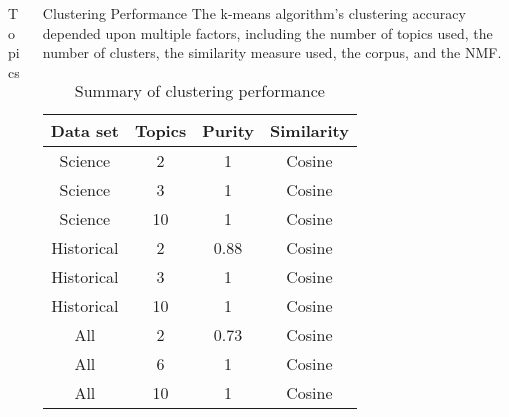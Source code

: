 \documentclass[final]{beamer}
\newlength{\onecolwid}
\newlength{\twocolwid}
\begin{document}
\begin{frame}[t]
\begin{columns}[t]
\begin{column}{\twocolwid}
\begin{columns}[t,totalwidth=\twocolwid]
\begin{column}{\onecolwid}
\begin{block}{Topics}
\end{block}


\end{column} %

\begin{column}{\onecolwid} %


\begin{block}{Clustering Performance}
The k-means algorithm's clustering accuracy depended upon multiple factors, including the number of topics used, the number of clusters, the similarity measure used, the corpus, and the NMF.

\begin{table}
\vspace{2ex}
\begin{tabular}{|c|c|c|c|}
\toprule
\textbf{Data set} & \textbf{Topics} & \textbf{Purity} & \textbf{Similarity}\\
\midrule
	Science & 2 & 1 & Cosine \\ \hline
	Science & 3 & 1 & Cosine \\ \hline
	Science & 10 & 1 & Cosine \\ \hline \hline
	Historical & 2 & 0.88 & Cosine \\ \hline
	Historical & 3 & 1 & Cosine \\ \hline
	Historical & 10 & 1 & Cosine \\ \hline \hline
	All & 2 & 0.73 & Cosine \\ \hline
	All & 6 & 1 & Cosine \\ \hline
	All & 10 & 1 & Cosine \\ \hline
	
\end{tabular}
\caption{Summary of clustering performance}
\end{table}

\end{block}


\end{column} %


\end{columns}
\end{column}
\end{columns}
\end{frame}
\end{document}
